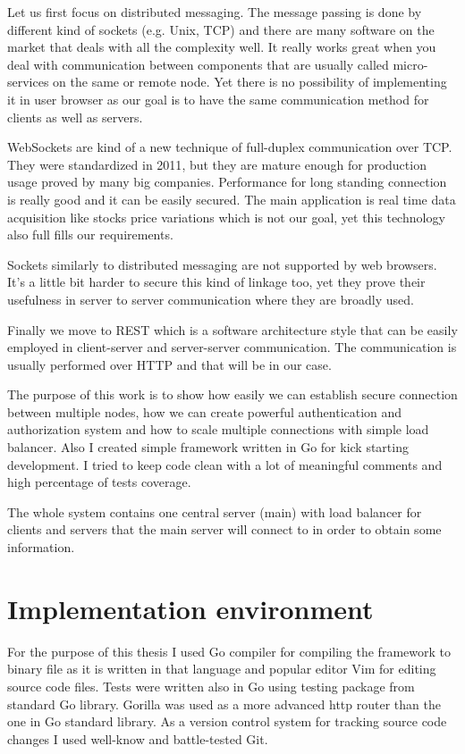 Let us first focus on distributed messaging. The message passing is done by different kind of sockets (e.g. Unix, TCP) and there are many software on the market that deals with all the complexity well. It really works great when you deal with communication between components that are usually called micro-services on the same or remote node. Yet there is no possibility of implementing it in user browser as our goal is to have the same communication method for clients as well as servers.

WebSockets are kind of a new technique of full-duplex communication over TCP\@. They were standardized in 2011\cite{WebSockets-wiki}, but they are mature enough for production usage proved by many big companies. Performance for long standing connection is really good and it can be easily secured. The main application is real time data acquisition like stocks price variations which is not our goal, yet this technology also full fills our requirements.

Sockets similarly to distributed messaging are not supported by web browsers. It's a little bit harder to secure this kind of linkage too, yet they prove their usefulness in server to server communication where they are broadly used.

Finally we move to REST which is a software architecture style that can be easily employed in client-server and server-server communication. The communication is usually performed over HTTP and that will be in our case.

The purpose of this work is to show how easily we can establish secure connection between multiple nodes, how we can create powerful authentication and authorization system and how to scale multiple connections with simple load balancer. Also I created simple framework written in Go for kick starting development. I tried to keep code clean with a lot of meaningful comments and high percentage of tests coverage.

The whole system contains one central server (main) with load balancer for clients and servers that the main server will connect to in order to obtain some information.

\section{Implementation environment}
For the purpose of this thesis I used Go compiler for compiling the framework to binary file as it is written in that language and popular editor Vim for editing source code files. Tests were written also in Go using testing package from standard Go library. Gorilla was used as a more advanced http router than the one in Go standard library. As a version control system for tracking source code changes I used well-know and battle-tested Git.
